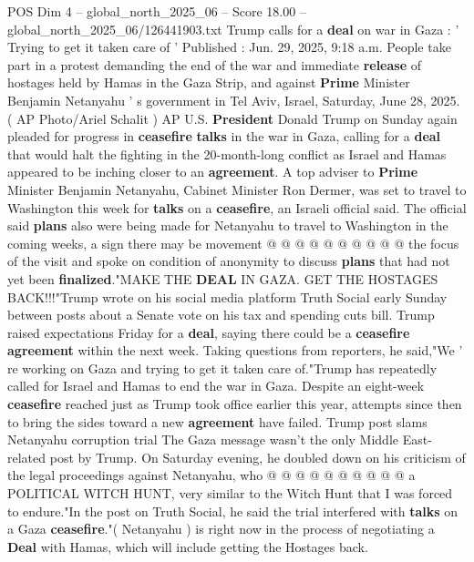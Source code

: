 \begin{textsample}{POS Dim 4 – global\_north\_2025\_06 – Score 18.00 – global\_north\_2025\_06/126441903.txt}  \label{ex:f4_pos_398}
Trump calls for a \textbf{deal} on war in Gaza : ' Trying to get it taken care of ' Published : Jun. 29, 2025, 9:18 a.m.
People take part in a protest demanding the end of the war and immediate \textbf{release} of hostages held by Hamas in the Gaza Strip, and against \textbf{Prime} Minister Benjamin Netanyahu ' s government in Tel Aviv, Israel, Saturday, June 28, 2025. ( AP Photo/Ariel Schalit ) AP U.S. \textbf{President} Donald Trump on Sunday again pleaded for progress in \textbf{ceasefire} \textbf{talks} in the war in Gaza, calling for a \textbf{deal} that would halt the fighting in the 20-month-long conflict as Israel and Hamas appeared to be inching closer to an \textbf{agreement}.
A top adviser to \textbf{Prime} Minister Benjamin Netanyahu, Cabinet Minister Ron Dermer, was set to travel to Washington this week for \textbf{talks} on a \textbf{ceasefire}, an Israeli official said.
The official said \textbf{plans} also were being made for Netanyahu to travel to Washington in the coming weeks, a sign there may be movement @ @ @ @ @ @ @ @ @ @ the focus of the visit and spoke on condition of anonymity to discuss \textbf{plans} that had not yet been \textbf{finalized}."MAKE THE \textbf{DEAL} IN GAZA.
GET THE HOSTAGES BACK!!!"Trump wrote on his social media platform Truth Social early Sunday between posts about a Senate vote on his tax and spending cuts bill.
Trump raised expectations Friday for a \textbf{deal}, saying there could be a \textbf{ceasefire} \textbf{agreement} within the next week.
Taking questions from reporters, he said,"We ' re working on Gaza and trying to get it taken care of."Trump has repeatedly called for Israel and Hamas to end the war in Gaza.
Despite an eight-week \textbf{ceasefire} reached just as Trump took office earlier this year, attempts since then to bring the sides toward a new \textbf{agreement} have failed.
Trump post slams Netanyahu corruption trial The Gaza message wasn't the only Middle East-related post by Trump.
On Saturday evening, he doubled down on his criticism of the legal proceedings against Netanyahu, who @ @ @ @ @ @ @ @ @ @ a POLITICAL WITCH HUNT, very similar to the Witch Hunt that I was forced to endure."In the post on Truth Social, he said the trial interfered with \textbf{talks} on a Gaza \textbf{ceasefire}."( Netanyahu ) is right now in the process of negotiating a \textbf{Deal} with Hamas, which will include getting the Hostages back.

\end{textsample}
